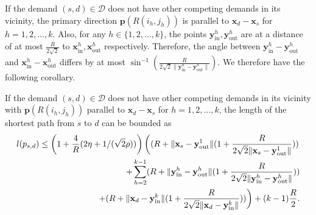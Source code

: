 \documentclass[acmsmall, screen]{acmart}
\begin{document}
If the demand $(s,d) \in \mathcal{D}$ does not have other competing demands in its vicinity, the primary direction $\mathbf{p}(R(i_h, j_h))$ is parallel to $\mathbf{x}_d - \mathbf{x}_s$ for $h=1,2,\ldots,k$. 
Also, for any $h \in \{1,2,\ldots,k\}$, the points $\mathbf{y}^h_\mathrm{in}, \mathbf{y}^h_\mathrm{out}$ are at a distance of at most $\frac{R}{2\sqrt{2}}$ to $\mathbf{x}^h_\mathrm{in}, \mathbf{x}^h_\mathrm{out}$ respectively. 
Therefore, the angle between $\mathbf{y}^h_\mathrm{in} - \mathbf{y}^h_\mathrm{out}$ and  $\mathbf{x}^h_\mathrm{in} - \mathbf{x}^h_\mathrm{out}$ differs by at most $\sin^{-1}\left(\frac{R}{2\sqrt{2}\| \mathbf{y}^h_\mathrm{in} - \mathbf{y}^h_\mathrm{out} \|} \right)$. 
We therefore have the following corollary. 
\begin{corollary}
If the demand $(s,d) \in \mathcal{D}$ does not have other competing demands in its vicinity with $\mathbf{p}(R(i_h, j_h))$ parallel to $\mathbf{x}_d - \mathbf{x}_s$ for $h=1,2,\ldots,k$, the length of the shortest path from $s$ to $d$ can be bounded as
\begin{align}
l(p_{s,d}) \leq \left(1 + \frac{4}{R}(2\eta + 1/(\sqrt{2}\rho)) \right) \left( (R + \| \mathbf{x}_s - \mathbf{y}^1_\mathrm{out} \|(1  + \frac{R}{2\sqrt{2}\| \mathbf{x}_s - \mathbf{y}^1_\mathrm{out} \|}  ) ) \right. \notag \\
+ \sum_{h=2}^{k-1} (R + \| \mathbf{y}^h_\mathrm{in} - \mathbf{y}^h_\mathrm{out} \|(1 + \frac{R}{2\sqrt{2}\| \mathbf{y}^h_\mathrm{in} - \mathbf{y}^h_\mathrm{out} \|}  ) )\notag \\
\left. + (R + \| \mathbf{x}_d - \mathbf{y}^k_\mathrm{in} \|(1 + \frac{R}{2\sqrt{2}\| \mathbf{x}_d - \mathbf{y}^k_\mathrm{in} \|} ) ) \right) + (k-1)\frac{R}{2}.  
\end{align} 
\end{corollary}
\end{document}

